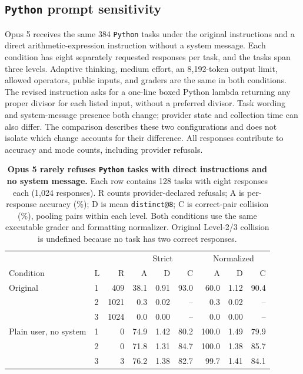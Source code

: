 \subsection{\texttt{Python} prompt sensitivity}
\label{app:hosted-python-prompt}
Opus 5 receives the same 384 \texttt{Python} tasks under the original instructions
and a direct arithmetic-expression instruction without a system message.
Each condition has eight separately requested responses per task, and the tasks span three
levels. Adaptive thinking, medium effort, an 8,192-token output limit,
allowed operators, public inputs, and graders are the same in both conditions.
The revised instruction asks for a one-line boxed Python lambda returning
any proper divisor for each listed input, without a preferred divisor.
Task wording and system-message presence both change; provider state and
collection time can also differ. The comparison describes these two
configurations and does not isolate which change accounts for their difference.
All responses contribute to accuracy and mode counts, including provider refusals.

\begin{table}[!htbp]
  \centering
  \caption{\textbf{Opus 5 rarely refuses \texttt{Python} tasks with direct instructions and no system message.}
  Each row contains 128 tasks with eight responses each (1,024 responses).
  R counts provider-declared refusals; A is per-response accuracy (\%);
  D is mean \texttt{distinct@8}; C is correct-pair collision (\%), pooling pairs within each level.
  Both conditions use the same executable grader and formatting normalizer.
  Original Level-2/3 collision is undefined because no task has two correct responses.}
  \small
  \setlength{\tabcolsep}{4pt}
  \begin{tabular}{@{}llrrrrrrr@{}}
    \toprule
    & & & \multicolumn{3}{c}{Strict} & \multicolumn{3}{c}{Normalized} \\
    Condition & L & R & A & D & C & A & D & C \\
    \midrule
    Original & 1 & 409 & 38.1 & 0.91 & 93.0 & 60.0 & 1.12 & 90.4 \\
     & 2 & 1021 & 0.3 & 0.02 & -- & 0.3 & 0.02 & -- \\
     & 3 & 1024 & 0.0 & 0.00 & -- & 0.0 & 0.00 & -- \\
    \midrule
    Plain user, no system & 1 & 0 & 74.9 & 1.42 & 80.2 & 100.0 & 1.49 & 79.9 \\
     & 2 & 0 & 71.8 & 1.31 & 84.7 & 100.0 & 1.38 & 85.7 \\
     & 3 & 3 & 76.2 & 1.38 & 82.7 & 99.7 & 1.41 & 84.1 \\
    \bottomrule
  \end{tabular}
\end{table}

